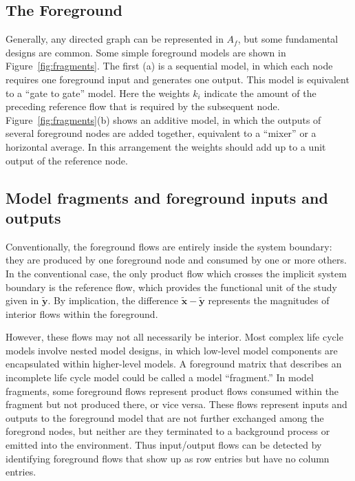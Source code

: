 \subsection{The Foreground}



Generally, any directed graph can be represented in $A_f$, but some fundamental designs are common.  Some simple foreground models are shown in Figure~\ref{fig:fragments}.  The first (a) is a sequential model, in which each node requires one foreground input and generates one output. This model is equivalent to a ``gate to gate'' model.  Here the weights $k_i$ indicate the amount of the preceding reference flow that is required by the subsequent node.  Figure~\ref{fig:fragments}(b) shows an additive model, in which the outputs of several foreground nodes are added together, equivalent to a ``mixer'' or a horizontal average.  In this arrangement the weights %
should add up to a unit output of the reference node. 

\subsection{Model fragments and foreground inputs and outputs}

Conventionally, the foreground flows are entirely inside the system boundary: they are produced by one foreground node and consumed by one or more others.  In the conventional case, the only product flow which crosses the implicit system boundary is the reference flow, which provides the functional unit of the study given in $\tilde{\mathbf{y}}$.  By implication, the difference $\tilde{\mathbf{x}} - \tilde{\mathbf{y}}$ represents the magnitudes of interior flows within the foreground. 
   
However, these flows may not all necessarily be interior.  Most complex life cycle models involve nested model designs, in which low-level model components are encapsulated within higher-level models.  A foreground matrix that describes an incomplete life cycle model could be called a model ``fragment.''  In model fragments, some foreground flows represent product flows consumed within the fragment but not produced there, or vice versa. These flows represent inputs and outputs to the foreground model that are not further exchanged among the foregrond nodes, but neither are they terminated to a background process or emitted into the environment.  Thus input/output flows can be detected by identifying foreground flows that show up as row entries but have no column entries.

